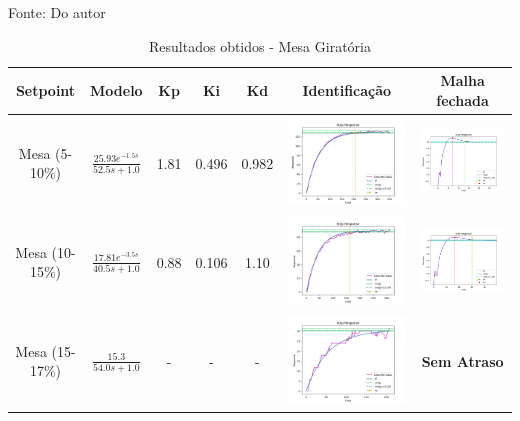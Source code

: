 \begin{table}[!htbp]
\begin{tabular}{|c|c|c|c|c|c|c|}
\hline
\end{tabular}
\label{tab:results_forno}
\vspace{0cm}\hspace{0cm}\small{Fonte: Do autor}
\end{table}

\begin{table}[!htbp]
\caption{Resultados obtidos - Mesa Giratória}
\centering
\begin{tabular}{|c|c|c|c|c|c|c|}
\hline
\textbf{Setpoint} & \textbf{Modelo} & \textbf{Kp} & \textbf{Ki} & \textbf{Kd} & \textbf{Identificação} & \textbf{Malha fechada} \\
\hline
Mesa (5-10\%) & $\frac{25.93 e^{-1.5s}}{52.5s + 1.0}$ & 1.81 & 0.496 & 0.982 & \includegraphics[width=0.2\linewidth]{figuras/mesa_5_10} & \includegraphics[width=0.2\linewidth]{figuras/mesa_5_10c} \\
\hline
Mesa (10-15\%) & $\frac{17.81 e^{-3.5s}}{40.5s + 1.0}$ & 0.88 & 0.106 & 1.10 & \includegraphics[width=0.2\linewidth]{figuras/mesa_10_15} & \includegraphics[width=0.2\linewidth]{figuras/mesa_10_15c} \\
\hline
Mesa (15-17\%) & $\frac{15.3}{54.0s + 1.0}$ & - & - & - & \includegraphics[width=0.2\linewidth]{figuras/mesa_15_17} & \textbf{Sem Atraso} \\

\end{tabular}
\end{table}
